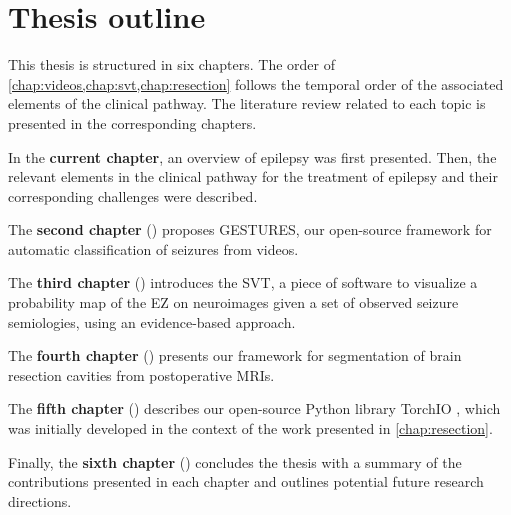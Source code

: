 \section{Thesis outline}

This thesis is structured in six chapters.
The order of \cref{chap:videos,chap:svt,chap:resection} follows the temporal order of the associated elements of the clinical pathway.
The literature review related to each topic is presented in the corresponding chapters.

In the \textbf{current chapter}, an overview of epilepsy was first presented.
Then, the relevant elements in the clinical pathway for the treatment of epilepsy and their corresponding challenges were described.

The \textbf{second chapter} () proposes \ac{GESTURES}, our open-source framework for automatic classification of seizures from videos.

The \textbf{third chapter} () introduces the \ac{SVT}, a piece of software to visualize a probability map of the \ac{EZ} on neuroimages given a set of observed seizure semiologies, using an evidence-based approach.

The \textbf{fourth chapter} () presents our framework for segmentation of brain resection cavities from postoperative \acp{MRI}.

The \textbf{fifth chapter} () describes our open-source Python library TorchIO \cite{perez-garcia_torchio_2021}, which was initially developed in the context of the work presented in \cref{chap:resection}.

Finally, the \textbf{sixth chapter} () concludes the thesis with a summary of the contributions presented in each chapter and outlines potential future research directions.

